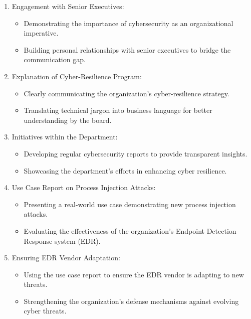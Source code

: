 \begin{enumerate}
      \item Engagement with Senior Executives:
         \begin{itemize}
            \item Demonstrating the importance of cybersecurity as an organizational imperative.
            \item Building personal relationships with senior executives to bridge the communication gap.
         \end{itemize}
         
      \item Explanation of Cyber-Resilience Program:
         \begin{itemize}
            \item Clearly communicating the organization's cyber-resilience strategy.
            \item Translating technical jargon into business language for better understanding by the board.
         \end{itemize}
         
      \item Initiatives within the Department:
         \begin{itemize}
            \item Developing regular cybersecurity reports to provide transparent insights.
            \item Showcasing the department's efforts in enhancing cyber resilience.
         \end{itemize}
         
      \item Use Case Report on Process Injection Attacks:
         \begin{itemize}
            \item Presenting a real-world use case demonstrating new process injection attacks.
            \item Evaluating the effectiveness of the organization's Endpoint Detection Response system (EDR).
         \end{itemize}
         
      \item Ensuring EDR Vendor Adaptation:
         \begin{itemize}
            \item Using the use case report to ensure the EDR vendor is adapting to new threats.
            \item Strengthening the organization's defense mechanisms against evolving cyber threats.
         \end{itemize}
\end{enumerate}


